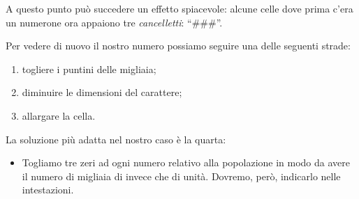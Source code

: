 A questo punto può succedere un effetto spiacevole: alcune celle
dove prima c'era un numerone ora appaiono tre \emph{cancelletti}: ``\#\#\#''.

\vspace{.5em}

Per vedere di nuovo il nostro numero possiamo seguire una delle seguenti
strade:

\begin{enumerate} [noitemsep]
\item togliere i puntini delle migliaia;
\item diminuire le dimensioni del carattere;
\item allargare la cella.
\end{enumerate}

La soluzione più adatta nel nostro caso è la quarta:
\begin{itemize}
\item 
Togliamo tre zeri ad ogni numero relativo alla popolazione in modo da avere 
il numero di migliaia di invece che di unità. Dovremo, però, indicarlo nelle 
intestazioni.
\end{itemize}


